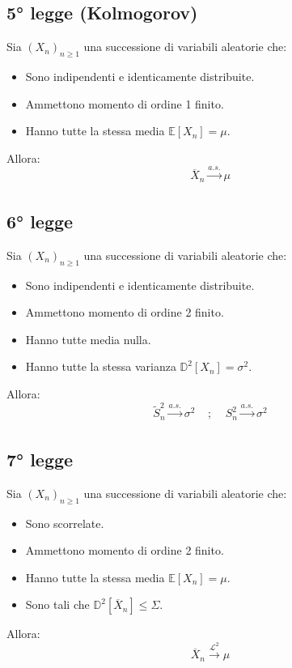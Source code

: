 \documentclass{article}
\begin{document}
\subsection*{5° legge (Kolmogorov)}
Sia $(X_{n})_{n\geq 1}$ una successione di variabili aleatorie che:
\begin{itemize}
\item Sono indipendenti e identicamente distribuite.
\item Ammettono momento di ordine 1 finito.
\item Hanno tutte la stessa media $\mathbb{E}[X_{n}] = \mu$.
\end{itemize}
Allora:
\[ \overline{X}_{n} \xrightarrow[]{a.s.}\mu \]

\subsection*{6° legge}
Sia $(X_{n})_{n\geq 1}$ una successione di variabili aleatorie che:
\begin{itemize}
\item Sono indipendenti e identicamente distribuite.
\item Ammettono momento di ordine 2 finito.
\item Hanno tutte media nulla.
\item Hanno tutte la stessa varianza $\mathbb{D}^{2}[X_{n}] = \sigma^{2}$.
\end{itemize}
Allora:
\[ \widetilde{S}_{n}^{2} \xrightarrow[]{a.s.}\sigma^{2} \; \; \; \; ; \; \; \; \; S_{n}^{2} \xrightarrow[]{a.s.}\sigma^{2} \]

\subsection*{7° legge}
Sia $(X_{n})_{n\geq 1}$ una successione di variabili aleatorie che:
\begin{itemize}
\item Sono scorrelate.
\item Ammettono momento di ordine 2 finito.
\item Hanno tutte la stessa media $\mathbb{E}[X_{n}] = \mu$.
\item Sono tali che $\mathbb{D}^{2}[\overline{X}_{n}] \leq \Sigma$.
\end{itemize}
Allora:
\[ \overline{X}_{n} \xrightarrow[]{\mathcal{L}^{2}}\mu \]
\end{document}
